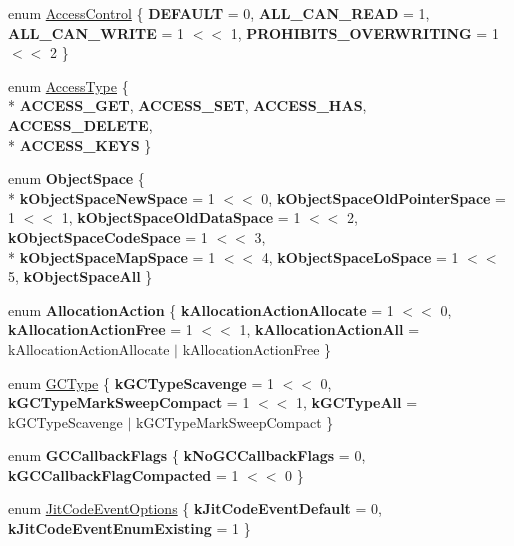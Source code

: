 \begin{DoxyCompactItemize}
\item 
enum \hyperlink{namespacev8_a31d8355cb043d7d2dda3f4a52760b64e}{Access\+Control} \{ {\bfseries D\+E\+F\+A\+U\+L\+T} = 0, 
{\bfseries A\+L\+L\+\_\+\+C\+A\+N\+\_\+\+R\+E\+A\+D} = 1, 
{\bfseries A\+L\+L\+\_\+\+C\+A\+N\+\_\+\+W\+R\+I\+T\+E} = 1 $<$$<$ 1, 
{\bfseries P\+R\+O\+H\+I\+B\+I\+T\+S\+\_\+\+O\+V\+E\+R\+W\+R\+I\+T\+I\+N\+G} = 1 $<$$<$ 2
 \}
\item 
enum \hyperlink{namespacev8_add8bef6469c5b94706584124e610046c}{Access\+Type} \{ \\*
{\bfseries A\+C\+C\+E\+S\+S\+\_\+\+G\+E\+T}, 
{\bfseries A\+C\+C\+E\+S\+S\+\_\+\+S\+E\+T}, 
{\bfseries A\+C\+C\+E\+S\+S\+\_\+\+H\+A\+S}, 
{\bfseries A\+C\+C\+E\+S\+S\+\_\+\+D\+E\+L\+E\+T\+E}, 
\\*
{\bfseries A\+C\+C\+E\+S\+S\+\_\+\+K\+E\+Y\+S}
 \}
\item 
\hypertarget{namespacev8_ae7bc5b0bd1100e94d78de255daa8ebc3}{}enum {\bfseries Object\+Space} \{ \\*
{\bfseries k\+Object\+Space\+New\+Space} = 1 $<$$<$ 0, 
{\bfseries k\+Object\+Space\+Old\+Pointer\+Space} = 1 $<$$<$ 1, 
{\bfseries k\+Object\+Space\+Old\+Data\+Space} = 1 $<$$<$ 2, 
{\bfseries k\+Object\+Space\+Code\+Space} = 1 $<$$<$ 3, 
\\*
{\bfseries k\+Object\+Space\+Map\+Space} = 1 $<$$<$ 4, 
{\bfseries k\+Object\+Space\+Lo\+Space} = 1 $<$$<$ 5, 
{\bfseries k\+Object\+Space\+All}
 \}\label{namespacev8_ae7bc5b0bd1100e94d78de255daa8ebc3}

\item 
\hypertarget{namespacev8_ae2b70dd2abba164d9ad9ffc9f757eca9}{}enum {\bfseries Allocation\+Action} \{ {\bfseries k\+Allocation\+Action\+Allocate} = 1 $<$$<$ 0, 
{\bfseries k\+Allocation\+Action\+Free} = 1 $<$$<$ 1, 
{\bfseries k\+Allocation\+Action\+All} = k\+Allocation\+Action\+Allocate $\vert$ k\+Allocation\+Action\+Free
 \}\label{namespacev8_ae2b70dd2abba164d9ad9ffc9f757eca9}

\item 
enum \hyperlink{namespacev8_ac109d6f27e0c0f9ef4e98bcf7a806cf2}{G\+C\+Type} \{ {\bfseries k\+G\+C\+Type\+Scavenge} = 1 $<$$<$ 0, 
{\bfseries k\+G\+C\+Type\+Mark\+Sweep\+Compact} = 1 $<$$<$ 1, 
{\bfseries k\+G\+C\+Type\+All} = k\+G\+C\+Type\+Scavenge $\vert$ k\+G\+C\+Type\+Mark\+Sweep\+Compact
 \}
\item 
\hypertarget{namespacev8_a247c37a849f4d6c293b9b16e94e1944b}{}enum {\bfseries G\+C\+Callback\+Flags} \{ {\bfseries k\+No\+G\+C\+Callback\+Flags} = 0, 
{\bfseries k\+G\+C\+Callback\+Flag\+Compacted} = 1 $<$$<$ 0
 \}\label{namespacev8_a247c37a849f4d6c293b9b16e94e1944b}

\item 
enum \hyperlink{namespacev8_a06f34fa4fa4cfc8518366808d1d461c1}{Jit\+Code\+Event\+Options} \{ {\bfseries k\+Jit\+Code\+Event\+Default} = 0, 
{\bfseries k\+Jit\+Code\+Event\+Enum\+Existing} = 1
 \}
\end{DoxyCompactItemize}
